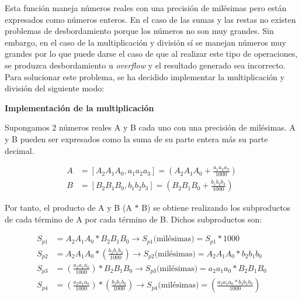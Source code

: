 	Esta función maneja números reales con una precisión de milésimas pero están expresados como números enteros. En el caso de las sumas y las restas no existen problemas de desbordamiento porque los números no son muy grandes. Sin embargo, en el caso de la multiplicación y división sí se manejan números muy grandes por lo que puede darse el caso de que al realizar este tipo de operaciones, se produzca desbordamiento u \textit{overflow} y el resultado generado sea incorrecto. Para solucionar este problema, se ha decidido implementar la multiplicación y división del siguiente modo:

\textbf{Implementación de la multiplicación}

	Supongamos 2 números reales A y B cada uno con una precisión de milésimas. A y B pueden ser expresados como la suma de su parte entera más su parte decimal.

\begin{equation*}
	\begin{aligned}
	A &= [A_{2}A_{1}A_{0},a_{1}a_{2}a_{3}] = \left( A_{2}A_{1}A_{0} + \frac{a_{1}a_{2}a_{3}}{1000}\right) \\
	B &= [B_{2}B_{1}B_{0},b_{1}b_{2}b_{3}]  = \left( B_{2}B_{1}B_{0} + \frac{b_{1}b_{2}b_{3}}{1000}\right)
	\end{aligned}
\end{equation*}

	Por tanto, el producto de A y B (A $\ast$ B) se obtiene realizando los subproductos de cada término de A por cada término de B. Dichos subproductos son:

\begin{equation*}
      \begin{aligned}
	 S_{p1} &= A_{2}A_{1}A_{0} \ast  B_{2}B_{1}B_{0} \rightarrow S_{p1} \text{(milésimas)} =  S_{p1} \ast 1000 \\
	 S_{p2} &= A_{2}A_{1}A_{0} \ast \left(\frac{b_{2}b_{1}b_{0}}{1000}\right) \rightarrow  S_{p2} \text{(milésimas)} = A_{2}A_{1}A_{0} \ast b_{2}b_{1}b_{0}\\
	 S_{p3} &= \left(\frac{a_{2}a_{1}a_{0}}{1000}\right) \ast B_{2}B_{1}B_{0} \rightarrow  S_{p3} \text{(milésimas)} = a_{2}a_{1}a_{0} \ast B_{2}B_{1}B_{0}\\
	 S_{p4} &= \left(\frac{a_{2}a_{1}a_{0}}{1000}\right) \ast \left(\frac{b_{2}b_{1}b_{0}}{1000}\right) \rightarrow  S_{p4} \text{(milésimas)}  = \left(\frac{a_{2}a_{1}a_{0} \ast b_{2}b_{1}b_{0}}{1000}\right) \\
      \end{aligned}
\end{equation*}

